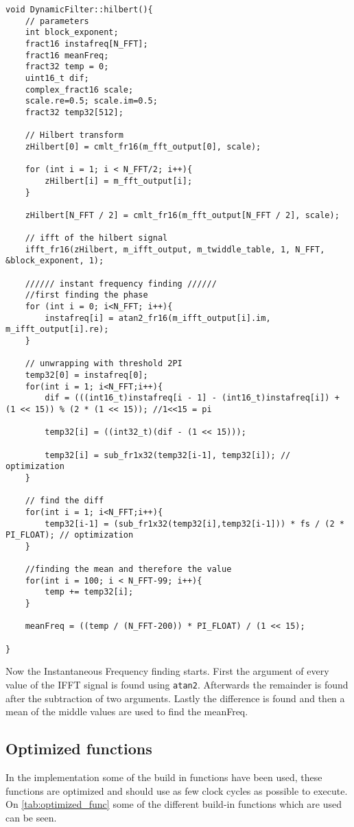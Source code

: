 \begin{verbatim}
void DynamicFilter::hilbert(){
	// parameters
	int block_exponent;
	fract16 instafreq[N_FFT];
	fract16 meanFreq;
	fract32 temp = 0;
	uint16_t dif;
	complex_fract16 scale;
	scale.re=0.5; scale.im=0.5;
	fract32 temp32[512];
			
	// Hilbert transform
	zHilbert[0] = cmlt_fr16(m_fft_output[0], scale);
	
	for (int i = 1; i < N_FFT/2; i++){
		zHilbert[i] = m_fft_output[i];
	}
		
	zHilbert[N_FFT / 2] = cmlt_fr16(m_fft_output[N_FFT / 2], scale);
	
	// ifft of the hilbert signal
	ifft_fr16(zHilbert, m_ifft_output, m_twiddle_table, 1, N_FFT, &block_exponent, 1);
		
	////// instant frequency finding //////
	//first finding the phase
	for (int i = 0; i<N_FFT; i++){
		instafreq[i] = atan2_fr16(m_ifft_output[i].im, m_ifft_output[i].re);
	}
	
	// unwrapping with threshold 2PI
	temp32[0] = instafreq[0];
	for(int i = 1; i<N_FFT;i++){
		dif = (((int16_t)instafreq[i - 1] - (int16_t)instafreq[i]) + (1 << 15)) % (2 * (1 << 15)); //1<<15 = pi
		
		temp32[i] = ((int32_t)(dif - (1 << 15)));
			
		temp32[i] = sub_fr1x32(temp32[i-1],	temp32[i]); // optimization
	}
		
	// find the diff
	for(int i = 1; i<N_FFT;i++){
		temp32[i-1] = (sub_fr1x32(temp32[i],temp32[i-1])) * fs / (2 * PI_FLOAT); // optimization
	}
		
	//finding the mean and therefore the value
	for(int i = 100; i < N_FFT-99; i++){
		temp += temp32[i];
	}
		
	meanFreq = ((temp / (N_FFT-200)) * PI_FLOAT) / (1 << 15);
		
}
\end{verbatim}
Now the Instantaneous Frequency finding starts. First the argument of every value of the IFFT signal is found using \texttt{atan2}.
Afterwards the remainder is found after the subtraction of two arguments.
Lastly the difference is found and then a mean of the middle values are used to find the meanFreq.

\subsection{Optimized functions}
In the implementation some of the build in functions have been used, these functions are optimized and should use as few clock cycles as possible to execute.
On \cref{tab:optimized_func}  some of the different build-in functions which are used can be seen.

